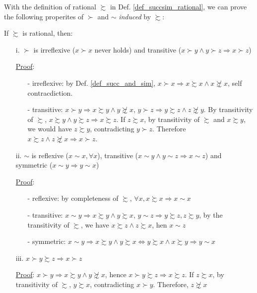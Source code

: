 With the definition of rational $\succsim$ in Def. \ref{def_succsim_rational}, we can prove the following properites of $\succ$ and $\sim$ \textit{induced} by $\succsim$:
\begin{theorem} If $\succsim$ is rational, then:
    \begin{enumerate}
        \item[i.] $\succ$ is irreflexive ($x\succ x$ never holds) and transitive ($x\succ y \land y\succ z\Rightarrow x\succ z$)
        
        \underline{Proof}:
        \begin{enumerate}
            \item[-] irreflexive: by Def. \ref{def_succ_and_sim}, $x\succ x\Rightarrow x\succsim x \land x\not\succsim x$, self contracdiction.
            \item[-] transitive: $x\succ y \Rightarrow x\succsim y \land y\not\succsim x$, $y\succ z \Rightarrow y\succsim z \land z\not\succsim y$. By transitivity of $\succsim$, $x\succsim y\land y\succsim z\Rightarrow x\succsim z$. If $z\succsim x$, by transitivity of $\succsim$ and $x\succsim y$, we would have $z\succsim y$, contradicting $y\succ z$. Therefore $x\succsim z \land z\not\succsim x\Rightarrow x\succ z$. 
        \end{enumerate}
        \item[ii.] $\sim$ is reflexive ($x\sim x, \forall x$), transitive ($x\sim y\land y\sim z\Rightarrow x\sim z$) and symmetric ($x\sim y\Rightarrow y\sim x$)
        
        \underline{Proof}:
        \begin{enumerate}
            \item[-] reflexive: by completeness of $\succsim$, $\forall x, x\succsim x\Rightarrow x\sim x$
            \item[-] transitive: $x\sim y\Rightarrow x\succsim y \land y\succsim x$, $y\sim z\Rightarrow y\succsim z, z\succsim y$, by the transitivity of $\succsim$, we have $x\succsim z \land z\succsim x$, hen $x\sim z$
            \item[-] symmetric: $x\sim y \Rightarrow x\succsim y \land y\succsim x\Leftrightarrow y\succsim x \land x\succsim y\Rightarrow y\sim x$
        \end{enumerate}
        \item[iii.] $x\succ y\succsim z\Rightarrow x\succ z$ 
        
        \underline{Proof}: $x\succ y\Rightarrow x\succsim y\land y\not\succsim x$, hence $x\succ y\succsim z\Rightarrow x\succsim z$. If $z\succsim x$, by transitivity of $\succsim$, $y\succsim x$, contradicting $x\succ y$. Therefore, $z\not\succsim x$
    \end{enumerate}
\end{theorem}

